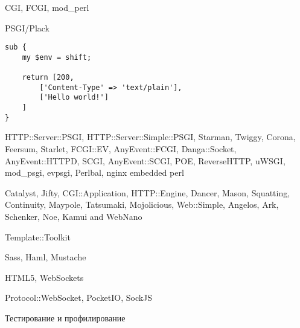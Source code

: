 \documentclass[14pt]{beamer}
\begin{document}
\begin{frame}
    \begin{center}
        CGI, FCGI, mod\_perl

        PSGI/Plack
    \end{center}
\end{frame}

\begin{frame}[fragile]
    \lstset{language=Perl}
    \begin{lstlisting}
sub {
    my $env = shift;

    return [200,
        ['Content-Type' => 'text/plain'],
        ['Hello world!']
    ]
}
    \end{lstlisting}
\end{frame}

\begin{frame}
    \begin{center}
HTTP::Server::PSGI, HTTP::Server::Simple::PSGI, Starman, Twiggy, Corona,
Feersum, Starlet, FCGI::EV, AnyEvent::FCGI, Danga::Socket, AnyEvent::HTTPD,
SCGI, AnyEvent::SCGI, POE, ReverseHTTP, uWSGI, mod\_psgi, evpsgi, Perlbal, nginx
embedded perl
    \end{center}
\end{frame}

\begin{frame}
    \begin{center}
Catalyst, Jifty, CGI::Application, HTTP::Engine, Dancer, Mason, Squatting,
Continuity, Maypole, Tatsumaki, Mojolicious, Web::Simple, Angelos, Ark,
Schenker, Noe, Kamui and WebNano
    \end{center}
\end{frame}

\begin{frame}
    \begin{center}
        Template::Toolkit

        Sass, Haml, Mustache
    \end{center}
\end{frame}

\begin{frame}
    \begin{center}
    HTML5, WebSockets

    Protocol::WebSocket, PocketIO, SockJS
    \end{center}
\end{frame}

\begin{frame}
    \begin{center}
        Тестирование и профилирование
    \end{center}
\end{frame}
\end{document}
